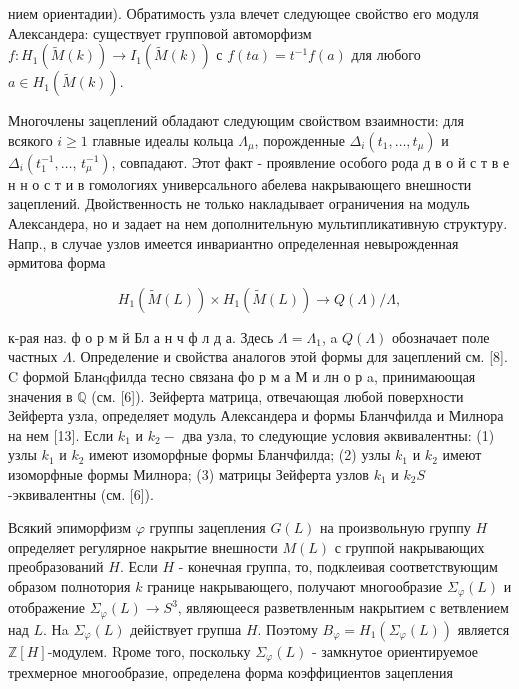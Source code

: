 \documentclass[10pt]{article}
\begin{document}
нием ориентадии). Обратимость узла влечет следующее свойство его модуля Александера: существует групповой автоморфизм $f: H_{1}(\tilde{M}(k)) \rightarrow I_{1}(\tilde{M}(k))$ с $f(t a)=t^{-1} f(a)$ для любого $a \in H_{1}(\tilde{M}(k))$.



Многочлены зацеплений обладают следующим своӥством взаимности: для всякого $i \geqslant 1$ главные идеалы кольца $\Lambda_{\mu}$, порожденные $\Delta_{i}\left(t_{1}, \ldots, t_{\mu}\right)$ и $\Delta_{i}\left(t_{1}^{-1}, \ldots\right.$, $\left.t_{\mu}^{-1}\right)$, совпадают. Этот факт - проявление особого рода д в о й с т в е н н о с т и в гомологиях универсального абелева накрывающего внешности зацеплений. Двойственность не только накладывает ограничения на модуль Александера, но и задает на нем дополнительную мультипликативную структуру. Напр., в случае узлов имеется инвариантно определенная невырожденная әрмитова форма



\[

H_{1}(\tilde{M}(L)) \times H_{1}(\tilde{M}(L)) \rightarrow Q(\Lambda) / \Lambda,

\]



к-рая наз. ф о р м й Бл а н ч ф л д а. Здесь $\Lambda=\Lambda_{1}$, a $Q(\Lambda)$ обозначает поле частных $\Lambda$. Определение и свойства аналогов этой формы для зацеплений см. [8]. $\mathrm{C}$ формой Бланqфилда тесно связана фо р м а М и лн о р a, принимаюощая значения в $\mathbb{Q}$ (см. [6]). Зейферта матрица, отвечающая любой поверхности Зейферта узла, определяет модуль Александера и формы Бланчфилда и Милнора на нем [13]. Если $k_{1}$ и $k_{2}-$ два узла, то следующие условия әквивалентны: (1) узлы $k_{1}$ и $k_{2}$ имеют изоморфные формы Бланчфилда; (2) узлы $k_{1}$ и $k_{2}$ имеют изоморфные формы Милнора; (3) матрицы Зейферта узлов $k_{1}$ и $k_{2} S$-эквивалентны (см. [6]).



Всякий эпиморфизм $\varphi$ группы зацепления $G(L)$ на произвольную группу $H$ определяет регулярное накрытие внешности $M(L)$ с группой накрывающих преобразований $H$. Если $H$ - конечная группа, то, подклеивая соответствующим образом полнотория $k$ границе накрывающего, получают многообразие $\Sigma_{\varphi}(L)$ и отображение $\Sigma_{\varphi}(L) \rightarrow S^{3}$, являющееся разветвленным накрытием с ветвлением над $L$. Нa $\Sigma_{\varphi}(L)$ дейіствует групша $H$. Поэтому $B_{\varphi}=H_{1}\left(\Sigma_{\varphi}(L)\right)$ является $\mathbb{Z}[H]$-модулем. Rроме того, поскольку $\Sigma_{\varphi}(L)$ - замкнутое ориентируемое трехмерное многообразие, определена форма коэффициентов зацепления
\end{document}
